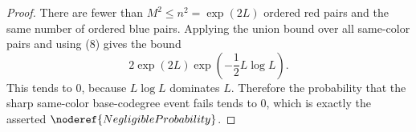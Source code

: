 \begin{proof}
There are fewer than \(M^2\le n^2=\exp(2L)\) ordered red pairs and the same
number of ordered blue pairs.  Applying the union bound over all same-color
pairs and using (8) gives the bound
\[
2\exp(2L)\exp\!\left(-\frac12 L\log L\right).
\]
This tends to \(0\), because \(L\log L\) dominates \(L\).  Therefore the
probability that the sharp same-color base-codegree event fails tends to
\(0\), which is exactly the asserted \(\noderef{NegligibleProbability}\).
\end{proof}
